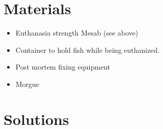 \documentclass[
  letterpaper,
  DIV=11,
  numbers=noendperiod]{scrreprt}
\providecommand{\tightlist}{%
  \setlength{\itemsep}{0pt}\setlength{\parskip}{0pt}}\usepackage{longtable,booktabs,array}
\begin{document}
\hypertarget{materials-57}{%
\section{Materials}\label{materials-57}}

\begin{itemize}
\tightlist
\item
  Euthanasia strength Mesab (see above)
\item
  Container to hold fish while being euthanized.
\item
  Post mortem fixing equipment
\item
  Morgue
\end{itemize}

\hypertarget{solutions-47}{%
\section{Solutions}\label{solutions-47}}
\end{document}
